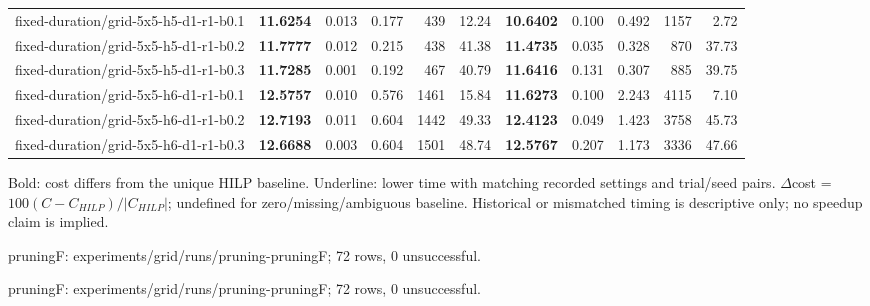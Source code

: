 \documentclass[10pt]{article}
\begin{document}
\begin{tabular}{p{65mm}rrrrrrrrrr}
fixed-\allowbreak duration/\allowbreak grid-\allowbreak 5x5-\allowbreak h5-\allowbreak d1-\allowbreak r1-\allowbreak b0.1 & \textbf{11.6254} & 0.013 & 0.177 & 439 & 12.24 & \textbf{10.6402} & 0.100 & 0.492 & 1157 & 2.72 \\
fixed-\allowbreak duration/\allowbreak grid-\allowbreak 5x5-\allowbreak h5-\allowbreak d1-\allowbreak r1-\allowbreak b0.2 & \textbf{11.7777} & 0.012 & 0.215 & 438 & 41.38 & \textbf{11.4735} & 0.035 & 0.328 & 870 & 37.73 \\
fixed-\allowbreak duration/\allowbreak grid-\allowbreak 5x5-\allowbreak h5-\allowbreak d1-\allowbreak r1-\allowbreak b0.3 & \textbf{11.7285} & 0.001 & 0.192 & 467 & 40.79 & \textbf{11.6416} & 0.131 & 0.307 & 885 & 39.75 \\
fixed-\allowbreak duration/\allowbreak grid-\allowbreak 5x5-\allowbreak h6-\allowbreak d1-\allowbreak r1-\allowbreak b0.1 & \textbf{12.5757} & 0.010 & 0.576 & 1461 & 15.84 & \textbf{11.6273} & 0.100 & 2.243 & 4115 & 7.10 \\
fixed-\allowbreak duration/\allowbreak grid-\allowbreak 5x5-\allowbreak h6-\allowbreak d1-\allowbreak r1-\allowbreak b0.2 & \textbf{12.7193} & 0.011 & 0.604 & 1442 & 49.33 & \textbf{12.4123} & 0.049 & 1.423 & 3758 & 45.73 \\
fixed-\allowbreak duration/\allowbreak grid-\allowbreak 5x5-\allowbreak h6-\allowbreak d1-\allowbreak r1-\allowbreak b0.3 & \textbf{12.6688} & 0.003 & 0.604 & 1501 & 48.74 & \textbf{12.5767} & 0.207 & 1.173 & 3336 & 47.66 \\
\bottomrule\end{tabular}\par
\medskip\footnotesize
Bold: cost differs from the unique HILP baseline. Underline: lower time with matching recorded settings and trial/seed pairs. $\Delta$cost = $100(C-C_{HILP})/|C_{HILP}|$; undefined for zero/missing/ambiguous baseline. Historical or mismatched timing is descriptive only; no speedup claim is implied.\par
pruningF: experiments/grid/runs/pruning-pruningF; 72 rows, 0 unsuccessful.\par
pruningF: experiments/grid/runs/pruning-pruningF; 72 rows, 0 unsuccessful.\par
\clearpage
\end{document}
